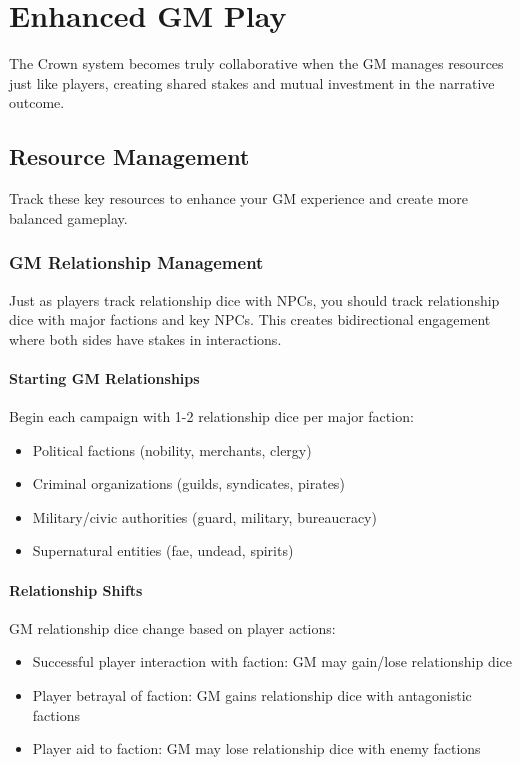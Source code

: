 \chapter{Enhanced GM Play}

The Crown system becomes truly collaborative when the GM manages resources just like players, creating shared stakes and mutual investment in the narrative outcome.

\section{Resource Management}

Track these key resources to enhance your GM experience and create more balanced gameplay.

\subsection{GM Relationship Management}

Just as players track relationship dice with NPCs, you should track relationship dice with major factions and key NPCs. This creates bidirectional engagement where both sides have stakes in interactions.

\subsubsection{Starting GM Relationships}

Begin each campaign with 1-2 relationship dice per major faction:
\begin{itemize}
\item Political factions (nobility, merchants, clergy)
\item Criminal organizations (guilds, syndicates, pirates)
\item Military/civic authorities (guard, military, bureaucracy)
\item Supernatural entities (fae, undead, spirits)
\end{itemize}

\subsubsection{Relationship Shifts}

GM relationship dice change based on player actions:
\begin{itemize}
\item Successful player interaction with faction: GM may gain/lose relationship dice
\item Player betrayal of faction: GM gains relationship dice with antagonistic factions
\item Player aid to faction: GM may lose relationship dice with enemy factions
\end{itemize}

